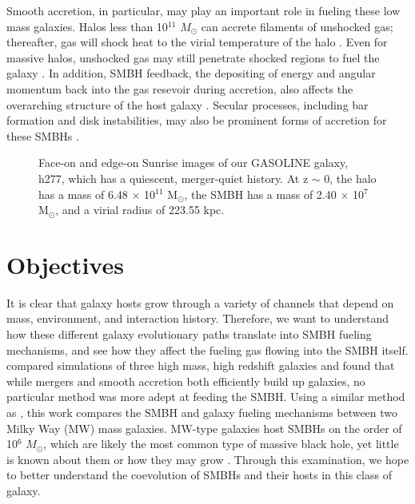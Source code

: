 \documentclass[12pt,headA,chapB]{fiskthesis}
\begin{document}
Smooth accretion, in particular, may play an important role in fueling these low mass galaxies. Halos less than 10$^{11}$ $M_{\odot}$ can accrete filaments of unshocked gas; thereafter, gas will shock heat to the virial temperature of the halo \citep{Keres2005}. Even for massive halos, unshocked gas may still penetrate shocked regions to fuel the galaxy \citep{Brooks2007,Dekel2009,Nelson2013}. In addition, SMBH feedback, the depositing of energy and angular momentum back into the gas resevoir during accretion, also affects the overarching structure of the host galaxy \citep{Governato2009a}. Secular processes, including bar formation and disk instabilities, may also be prominent forms of accretion for these SMBHs \citep{Kormendy2013}. 

\begin{figure}[h]
\centerline{}
\caption[GASOLINE h277]{Face-on and edge-on Sunrise images of our GASOLINE galaxy, h277, which has a quiescent, merger-quiet history. At z $\sim$ 0, the halo has a mass of 6.48 $\times$ 10$^{11}$ M$_{\odot}$, the SMBH has a mass of 2.40 $\times$ 10$^7$ M$_{\odot}$, and a virial radius of 223.55 kpc. }
\label{h277face} 
\end{figure}

\section{Objectives}
It is clear that galaxy hosts grow through a variety of channels that depend on mass, environment, and interaction history. Therefore, we want to understand how these different galaxy evolutionary paths translate into SMBH fueling mechanisms, and see how they affect the fueling gas flowing into the SMBH itself. \cite{Bellovary2013} compared simulations of three high mass, high redshift galaxies and found that while mergers and smooth accretion both efficiently build up galaxies, no particular method was more adept at feeding the SMBH. Using a similar method as \cite{Bellovary2013}, this work compares the SMBH and galaxy fueling mechanisms between two Milky Way (MW) mass galaxies. MW-type galaxies host SMBHs on the order of 10$^6$ $M_{\odot}$, which are likely the most common type of massive black hole, yet little is known about them or how they may grow \citep{Kormendy2013}. Through this examination, we hope to better understand the coevolution of SMBHs and their hosts in this class of galaxy. 
\end{document}
